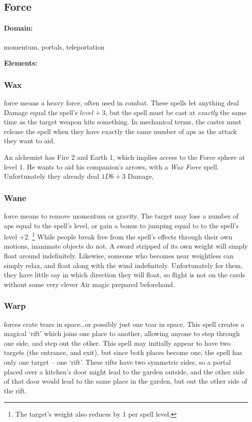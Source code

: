 \begin{multicols}{2}
\subsection{Force}
\paragraph{Domain:}
momentum, portals, teleportation

\textbf{Elements:}

\subsubsection{Wax}
force means a heavy force, often used in combat.
These spells let anything deal Damage equal the spell's $level + 3$, but the spell must be cast at \emph{exactly} the same time as the target weapon hits something.
In mechanical terms, the caster must release the spell when they have exactly the same number of \glspl{ap} as the attack they want to aid.

\begin{exampletext}
  An alchemist has Fire 2 and Earth 1, which implies access to the Force sphere at level 1.
  He wants to aid his companion's arrows, with a \textit{Wax Force} spell.
  Unfortunately they already deal $1D6+3$ Damage, 
\end{exampletext}

\subsubsection{Wane}
force means to remove momentum or gravity.
The target may lose a number of \glspl{ap} equal to the spell's level, or gain a bonus to jumping equal to to the spell's level +2.%
\footnote{The target's \gls{weight} also reduces by 1 per spell level.}
While people break free from the spell's effects through their own motions, inanimate objects do not.
A sword stripped of its own weight will simply float around indefinitely.
Likewise, someone who becomes near weightless can simply relax, and float along with the wind indefinitely.
Unfortunately for them, they have little say in which direction they will float, so flight is not on the cards without some very clever Air magic prepared beforehand.

\subsubsection{Warp}
forces crate tears in space\ldots or possibly just one tear in space.
This spell creates a magical `rift' which joins one place to another, allowing anyone to step through one side, and step out the other.
This spell may initially appear to have two targets (the entrance, and exit), but since both places become one, the spell has only one target -- one `rift'.
These rifts have two symmetric sides, so a portal placed over a kitchen's door might lead to the garden outside, and the other side of that door would lead to the same place in the garden, but out the other side of the rift.


\end{multicols}
